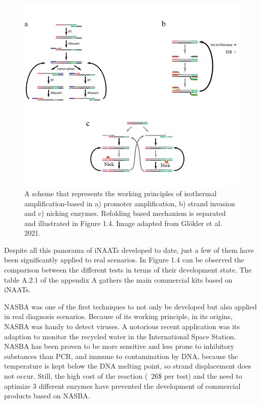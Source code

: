 \begin{figure}[b]
    \centering
    \includegraphics[width=1\textwidth]{data/iNAATs.png}
    \caption{A scheme that represents the working principles of isothermal amplification-based in a) promoter amplification, b) strand invasion and c) nicking enzymes. Refolding based mechanism is separated and illustrated in Figure 1.4. Image adapted from Glökler et al. 2021\cite{glokler_isothermal_2021}.}
    \label{fig:commercial iNAATs}
\end{figure}

Despite all this panorama of iNAATs developed to date, just a few of them have been significantly applied to real scenarios. In Figure 1.4 can be observed the comparison between the different tests in terms of their development state. The table A.2.1 of the appendix A gathers the main commercial kits based on iNAATs.

NASBA was one of the first techniques to not only be developed but also applied in real diagnosis scenarios. Because of its working principle, in its origins, NASBA was handy to detect viruses\cite{rutjes_real-time_2006}. A notorious recent application was its adaption to monitor the recycled water in the International Space Station\cite{bechy-loizeau_assessment_2015}. NASBA has been proven to be more sensitive and less prone to inhibitory substances than PCR\cite{rutjes_real-time_2006}, and immune to contamination by DNA, because the temperature is kept below the DNA melting point, so strand displacement does not occur\cite{simpkins_rna_2000}. Still, the high cost of the reaction (~26\$ per test\cite{oliveira_isothermal_2021}) and the need to optimize 3 different enzymes have prevented the development of commercial products based on NASBA.

